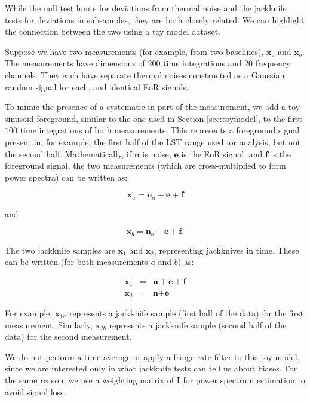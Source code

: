 \documentclass[preprint2,numberedappendix,tighten]{aastex6}  %
\begin{document}
While the null test hunts for deviations from thermal noise and the jackknife tests for deviations in subsamples, they are both 
closely related. We can highlight the connection between the two using a toy model dataset.

Suppose we have two measurements (for example, from two baselines), $\textbf{x}_{a}$ and $\textbf{x}_{b}$. The 
measurements have dimensions of $200$ time integrations and $20$ frequency channels. They each have separate thermal 
noises constructed as a Gaussian random signal for each, and identical EoR signals. 

To mimic the presence of a systematic in part of the measurement, we add a toy sinusoid foreground, similar to the one used in 
Section \ref{sec:toymodel}, to the first $100$ time integrations of both measurements. This represents a foreground signal 
present in, for example, the first half of the LST range used for analysis, but not the second half. Mathematically, if  $\textbf{n}$ 
is noise, $\textbf{e}$ is the EoR signal, and $\textbf{f}$ is the foreground signal, the two measurements (which are cross-multiplied to form power spectra) can be written as:

\begin{equation}
\label{eq:bias1}
\textbf{x}_{a} = \textbf{n}_{a} + \textbf{e} + \textbf{f}
\end{equation} 

\noindent and 

\begin{equation}
\label{eq:bias2}
\textbf{x}_{b} = \textbf{n}_{b} + \textbf{e} + \textbf{f}.
\end{equation}

\noindent The two jackknife samples are $\textbf{x}_{1}$ and $\textbf{x}_{2}$, representing jackknives in time. These can be 
written (for both measurements $a$ and $b$) as:

\begin{eqnarray}
\textbf{x}_{1} &=& \textbf{n} + \textbf{e} + \textbf{f} \\
\textbf{x}_{2} &=& \textbf{n} + \textbf{e} 
\end{eqnarray}

\noindent For example, $\textbf{x}_{1a}$ represents a jackknife sample (first half of the data) for the first measurement. 
Similarly, $\textbf{x}_{2b}$ represents a jackknife sample (second half of the data) for the second measurement.

We do not perform a time-average or apply a fringe-rate filter to this toy model, since we are interested only in what jackknife 
tests can tell us about biases. For the same reason, we use a weighting matrix of $\textbf{I}$ for power spectrum estimation to 
avoid signal loss. 
\end{document}

